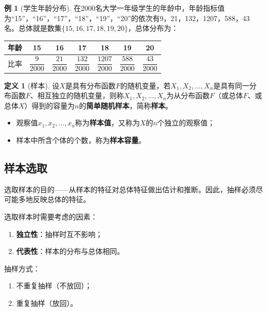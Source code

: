 \documentclass[11pt,a4paper]{report}
\theoremstyle{definition}
\newtheorem{definition}{定义}[chapter]
\newtheorem{example}{例}[chapter]
\begin{document}
\begin{example}[学生年龄分布]
在2000名大学一年级学生的年龄中，年龄指标值为``15''，``16''，``17''，``18''，``19''，``20''的依次有9，21，132，1207，588，43名。总体就是数集$\{15,16,17,18,19,20\}$，总体分布为：

\begin{table}[htbp]
\centering
\begin{tabular}{@{}ccccccc@{}}
\toprule
年龄 & 15 & 16 & 17 & 18 & 19 & 20 \\
\midrule
比率 & $\dfrac{9}{2000}$ & $\dfrac{21}{2000}$ & $\dfrac{132}{2000}$ & $\dfrac{1207}{2000}$ & $\dfrac{588}{2000}$ & $\dfrac{43}{2000}$ \\
\bottomrule
\end{tabular}
\end{table}
\end{example}

\begin{definition}[样本]
设$X$是具有分布函数$F$的随机变量，若$X_{1},X_{2},\ldots,X_{n}$是具有同一分布函数$F$、相互独立的随机变量，则称$X_{1},X_{2},\ldots,X_{n}$为从分布函数$F$（或总体$F$、或总体$X$）得到的容量为$n$的\textbf{简单随机样本}，简称\textbf{样本}。
\begin{itemize}[leftmargin=2em]
    \item 观察值$x_{1},x_{2},\ldots,x_{n}$称为\textbf{样本值}，又称为$X$的$n$个独立的观察值；
    \item 样本中所含个体的个数，称为\textbf{样本容量}。
\end{itemize}
\end{definition}

\subsection{样本选取}

选取样本的目的——从样本的特征对总体特征做出估计和推断。因此，抽样必须尽可能多地反映总体的特征。

选取样本时需要考虑的因素：
\begin{enumerate}[label=(\arabic*),leftmargin=2em]
    \item \textbf{独立性}：抽样时互不影响；
    \item \textbf{代表性}：样本的分布与总体相同。
\end{enumerate}

抽样方式：
\begin{enumerate}[label=(\arabic*),leftmargin=2em]
    \item 不重复抽样（不放回）；
    \item 重复抽样（放回）。
\end{enumerate}
\end{document}
